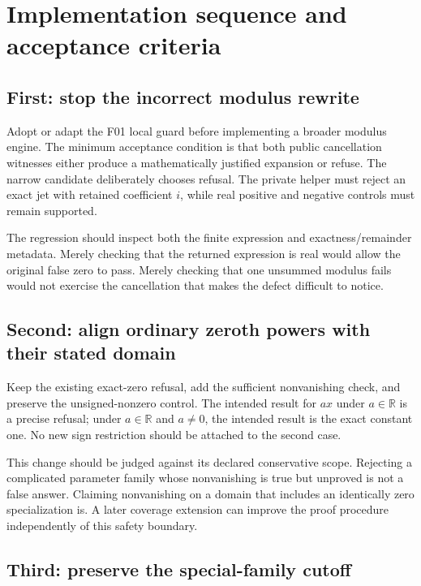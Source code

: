 \documentclass[11pt,letterpaper]{article}
\begin{document}
\section{Implementation sequence and acceptance criteria}

\subsection{First: stop the incorrect modulus rewrite}

Adopt or adapt the F01 local guard before implementing a broader modulus engine. The minimum acceptance condition is that both public cancellation witnesses either produce a mathematically justified expansion or refuse. The narrow candidate deliberately chooses refusal. The private helper must reject an exact jet with retained coefficient $i$, while real positive and negative controls must remain supported.

The regression should inspect both the finite expression and exactness/remainder metadata. Merely checking that the returned expression is real would allow the original false zero to pass. Merely checking that one unsummed modulus fails would not exercise the cancellation that makes the defect difficult to notice.

\subsection{Second: align ordinary zeroth powers with their stated domain}

Keep the existing exact-zero refusal, add the sufficient nonvanishing check, and preserve the unsigned-nonzero control. The intended result for $a x$ under $a\in\mathbb R$ is a precise refusal; under $a\in\mathbb R$ and $a\ne0$, the intended result is the exact constant one. No new sign restriction should be attached to the second case.

This change should be judged against its declared conservative scope. Rejecting a complicated parameter family whose nonvanishing is true but unproved is not a false answer. Claiming nonvanishing on a domain that includes an identically zero specialization is. A later coverage extension can improve the proof procedure independently of this safety boundary.

\subsection{Third: preserve the special-family cutoff}
\end{document}
